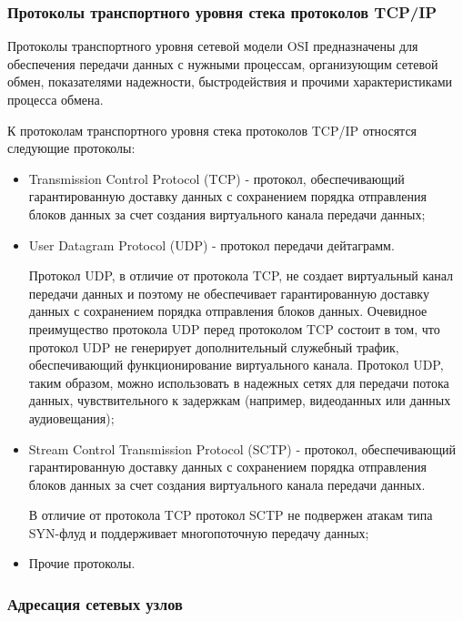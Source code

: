 
\newcommand{\myip}{192.168.91.1}
\newcommand{\virtip}{192.168.91.128}

\subsubsection{Протоколы транспортного уровня стека протоколов TCP/IP}

	Протоколы транспортного уровня сетевой модели OSI предназначены для обеспечения передачи данных с нужными процессам,
	организующим сетевой обмен, показателями надежности, быстродействия и прочими характеристиками процесса обмена.

	К протоколам транспортного уровня стека протоколов TCP/IP относятся следующие протоколы:

	\begin{itemize}

		\item Transmission Control Protocol (TCP) - протокол, обеспечивающий гарантированную доставку данных с сохранением порядка
		отправления блоков данных за счет создания виртуального канала передачи данных;

		\item User Datagram Protocol (UDP) - протокол передачи дейтаграмм.
		
		Протокол UDP, в отличие от протокола TCP, не создает виртуальный канал передачи данных и поэтому не обеспечивает
		гарантированную доставку данных с сохранением порядка отправления блоков данных.
		Очевидное преимущество протокола UDP перед протоколом TCP состоит в том,
		что протокол UDP не генерирует дополнительный служебный трафик, обеспечивающий функционирование виртуального
		канала. Протокол UDP, таким образом, можно использовать в надежных сетях для передачи потока данных,
		чувствительного к задержкам (например, видеоданных или данных аудиовещания);

		\item Stream Control Transmission Protocol (SCTP) - протокол, обеспечивающий гарантированную доставку данных с сохранением порядка
		отправления блоков данных за счет создания виртуального канала передачи данных.
		
		В отличие от протокола TCP протокол SCTP не подвержен атакам типа SYN-флуд и поддерживает многопоточную передачу данных;

		\item Прочие протоколы.

	\end{itemize}

\subsubsection{Адресация сетевых узлов}

